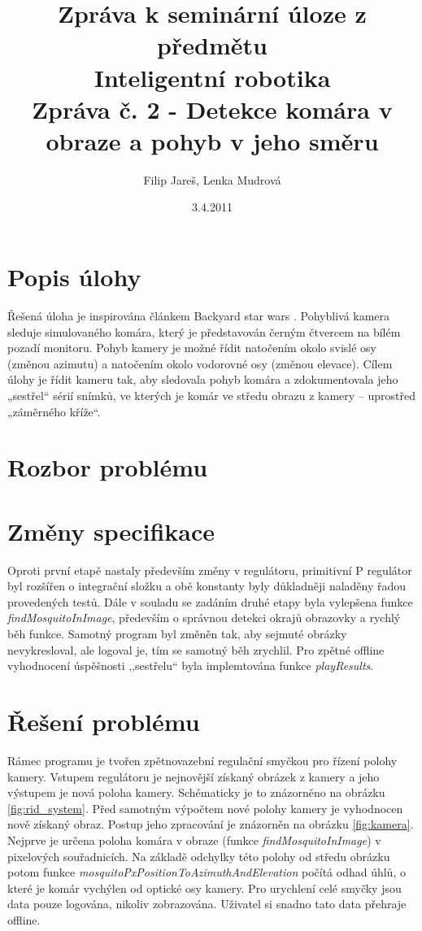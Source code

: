 \documentclass[a4paper,10pt]{article}
\title{Zpráva k seminární úloze z předmětu\\ Inteligentní robotika \\ {\small Zpráva č. 2 - Detekce komára v obraze a pohyb v jeho směru}}
\author{Filip Jareš, Lenka Mudrová}
\date{3.4.2011}
\begin{document}
\maketitle
\newpage


\section{Popis úlohy}

Řešená úloha je inspirována článkem Backyard star wars \cite{clanek}. Pohyblivá kamera sleduje simulovaného komára, který je představován černým čtvercem na bílém pozadí monitoru. Pohyb kamery je možné řídit natočením okolo svislé osy (změnou azimutu) a natočením okolo vodorovné osy (změnou elevace). Cílem úlohy je řídit kameru tak, aby sledovala pohyb komára a zdokumentovala jeho „sestřel“ sérií snímků, ve kterých je komár ve středu obrazu z kamery – uprostřed „záměrného kříže“.

\section{Rozbor problému}

\section{Změny specifikace}

Oproti první etapě nastaly především změny v regulátoru, primitivní P regulátor byl rozšířen o integrační složku a obě konstanty byly důkladněji naladěny řadou provedených testů. Dále v souladu se zadáním druhé etapy byla vylepšena funkce \textit{findMosquitoInImage}, především o správnou detekci okrajů obrazovky a rychlý běh funkce. Samotný program byl změněn tak, aby sejmuté obrázky nevykresloval, ale logoval je, tím se samotný běh zrychlil. Pro zpětné offline vyhodnocení úspěšnosti ,,sestřelu`` byla implemtována funkce \textit{playResults}.

\section{Řešení problému}

Rámec programu je tvořen zpětnovazební regulační smyčkou pro řízení polohy kamery. Vstupem regulátoru je nejnovější získaný obrázek z kamery a jeho výstupem je nová poloha kamery. Schématicky je to znázorněno na obrázku \ref{fig:rid_system}.
Před samotným výpočtem nové polohy kamery je vyhodnocen nově získaný obraz. Postup jeho zpracování je znázorněn na obrázku \ref{fig:kamera}.
Nejprve je určena poloha komára v obraze (funkce \textit{findMosquitoInImage}) v pixelových souřadnicích. Na základě odchylky této polohy od středu obrázku potom funkce \textit{mosquitoPxPositionToAzimuthAndElevation} počítá odhad úhlů, o které je komár vychýlen od optické osy kamery. Pro urychlení celé smyčky jsou data pouze logována, nikoliv zobrazována. Uživatel si snadno tato data přehraje offline.
\end{document}
